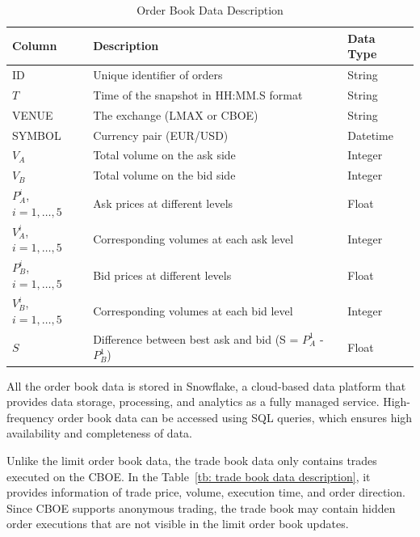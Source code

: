 \begin{table}[h]
    \centering
    \begin{tabular}{lll}
        \toprule
        \textbf{Column} & \textbf{Description} & \textbf{Data Type} \\
        \midrule
        ID & Unique identifier of orders & String \\
        $T$ & Time of the snapshot in HH:MM.S format & String \\
        VENUE & The exchange (LMAX or CBOE) & String \\
        SYMBOL & Currency pair (EUR/USD) & Datetime \\
        $V_A$ & Total volume on the ask side & Integer \\
        $V_B$ & Total volume on the bid side & Integer \\
        $P_A ^ {i}$, $i = 1, \dots, 5$ & Ask prices at different levels & Float \\
        $V_A ^ {i}$, $i = 1, \dots, 5$ & Corresponding volumes at each ask level & Integer \\
        $P_B ^ {i}$, $i = 1, \dots, 5$ & Bid prices at different levels & Float \\
        $V_B ^ {i}$, $i = 1, \dots, 5$ & Corresponding volumes at each bid level & Integer \\
        $S$ & Difference between best ask and bid (S = $P_A ^ {1}$ - $P_B ^ {1}$) & Float \\
        \bottomrule
    \end{tabular} 
    \caption{Order Book Data Description}
    \label{tb: order book data description}
\end{table}

All the order book data is stored in Snowflake, a cloud-based data platform that provides data storage, processing, and analytics as a fully managed service. High-frequency order book data can be accessed using SQL queries, which ensures high availability and completeness of data.

Unlike the limit order book data, the trade book data only contains trades executed on the CBOE. In the Table~\ref{tb: trade book data description}, it provides information of trade price, volume, execution time, and order direction. Since CBOE supports anonymous trading, the trade book may contain hidden order executions that are not visible in the limit order book updates.

